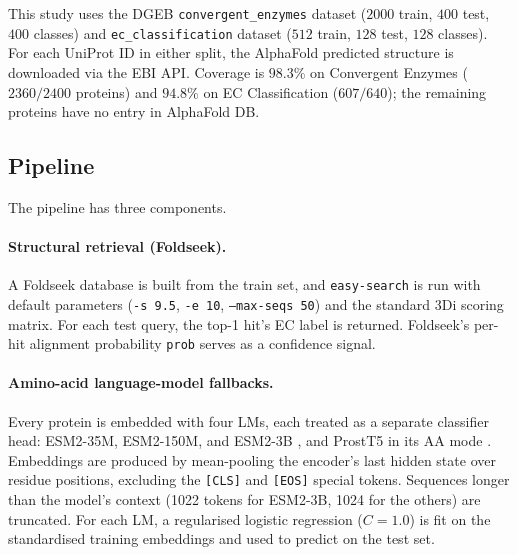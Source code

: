 \documentclass[11pt,letterpaper]{article}
\begin{document}
This study uses the DGEB \texttt{convergent\_\allowbreak enzymes}
dataset ($2000$ train, $400$ test, $400$ classes) and
\texttt{ec\_\allowbreak classification} dataset
($512$ train, $128$ test, $128$ classes). For each UniProt ID
in either split, the AlphaFold predicted structure
\citep{jumper2021alphafold,varadi2024afdb} is downloaded via the EBI
API. Coverage is $98.3\%$ on Convergent Enzymes
($2360 / 2400$ proteins) and $94.8\%$ on EC Classification
($607 / 640$); the remaining proteins have no entry in AlphaFold DB.

\subsection{Pipeline}

The pipeline has three components.

\paragraph{Structural retrieval (Foldseek).}
A Foldseek database is built from the train set, and
\texttt{easy-search} is run with default parameters
(\texttt{-s 9.5}, \texttt{-e 10}, \texttt{--max-seqs 50}) and the
standard 3Di scoring matrix. For each test query, the top-1 hit's EC
label is returned.
Foldseek's per-hit alignment probability \texttt{prob} serves as a
confidence signal.

\paragraph{Amino-acid language-model fallbacks.}
Every protein is embedded with four LMs, each treated as a separate
classifier head: ESM2-35M, ESM2-150M, and ESM2-3B
\citep{lin2023esm2}, and ProstT5 in its AA mode
\citep{heinzinger2024prostt5}. Embeddings are produced by mean-pooling
the encoder's last hidden state over residue positions, excluding the
\texttt{[CLS]} and \texttt{[EOS]} special tokens. Sequences longer than
the model's context (1022 tokens for ESM2-3B, 1024 for the others) are
truncated. For each LM, a regularised logistic regression ($C = 1.0$)
is fit on the standardised training embeddings and used to predict on
the test set.
\end{document}
